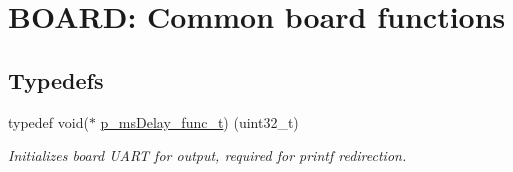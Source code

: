 \hypertarget{group__BOARD__COMMON__API}{}\section{B\+O\+A\+RD\+: Common board functions}
\label{group__BOARD__COMMON__API}
\subsection*{Typedefs}
\begin{DoxyCompactItemize}
\item 
typedef void($\ast$ \hyperlink{group__BOARD__COMMON__API_gae997487a4f312eb187c5e0201a7f1d5f}{p\+\_\+ms\+Delay\+\_\+func\+\_\+t}) (uint32\+\_\+t)
\begin{DoxyCompactList}\small\item\em Initializes board U\+A\+RT for output, required for printf redirection. \end{DoxyCompactList}\end{DoxyCompactItemize}
